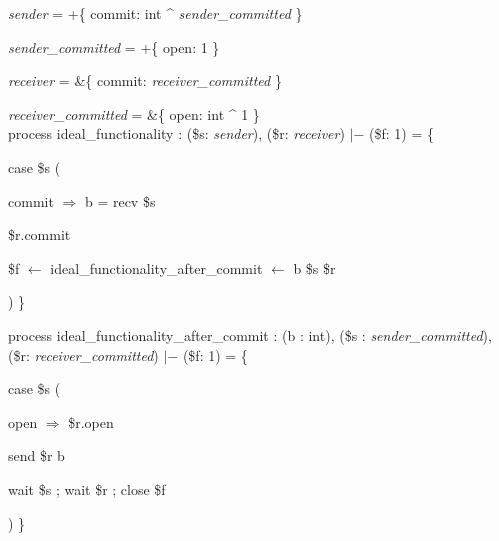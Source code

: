 \begin{bbox}[title={Commitment}]

\Type \textit{sender} = +\{ commit: int \^{} \textit{sender\_committed} \} 

\Type \textit{sender\_committed} = +\{ open: 1 \} 

\Type \textit{receiver} = \&\{ commit: \textit{receiver\_committed} \} 

\Type \textit{receiver\_committed} = \&\{ open: int \^{} 1 \} \\

process ideal\_functionality : (\$s: \textit{sender}), (\$r: \textit{receiver}) $|-$ (\$f: 1) =
\{

    \quad case \$s (

	    \qquad commit $\Rightarrow$ b = recv \$s
			
			\qqquad \$r.commit 

			\qqquad \$f $\leftarrow$ ideal\_functionality\_after\_commit $\leftarrow$ b \$s \$r 

	)
\}

process ideal\_functionality\_after\_commit : (b : int), (\$s : \textit{sender\_committed}), (\$r: \textit{receiver\_committed}) $|-$ (\$f: 1) =
\{

	\quad case \$s (

	\qquad open $\Rightarrow$ \$r.open 
	
		\qqquad send \$r b

		\qqquad wait \$s ; wait \$r ; close \$f 

	)
\}
\end{bbox}
